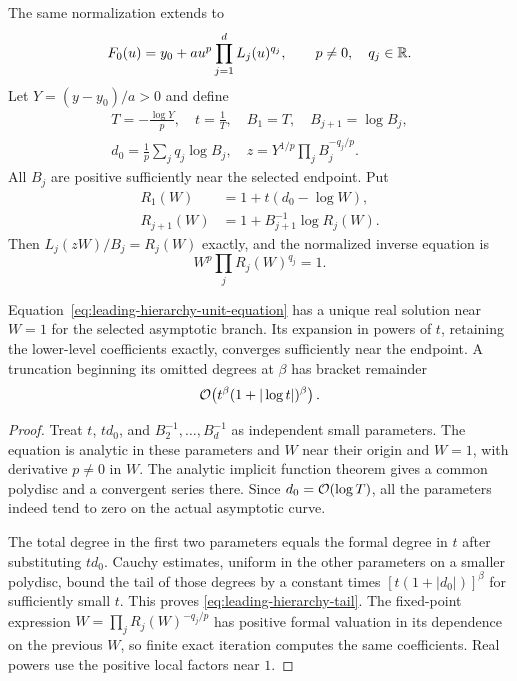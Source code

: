 The same normalization extends to
\begin{equation}
 F_0(u)=y_0+a u^p\prod_{j=1}^d L_j(u)^{q_j},
 \qquad p\ne0,\quad q_j\in\mathbb R.
 \label{eq:leading-hierarchy-core}
\end{equation}
Let $Y=(y-y_0)/a>0$ and define
\begin{equation}
\begin{gathered}
 T=-\frac{\log Y}{p},\quad t=\frac1T,\quad
 B_1=T,\quad B_{j+1}=\log B_j,\\
 d_0=\frac1p\sum_jq_j\log B_j,
 \quad z=Y^{1/p}\prod_jB_j^{-q_j/p}.
\end{gathered}
 \label{eq:leading-hierarchy-normalization}
\end{equation}
All $B_j$ are positive sufficiently near the selected endpoint. Put
\begin{align}
 R_1(W)&=1+t(d_0-\log W),\label{eq:leading-level-first-ratio}\\
 R_{j+1}(W)&=1+B_{j+1}^{-1}\log R_j(W).
 \label{eq:leading-level-next-ratio}
\end{align}
Then $L_j(zW)/B_j=R_j(W)$ exactly, and the normalized inverse equation is
\begin{equation}
 W^p\prod_jR_j(W)^{q_j}=1.
 \label{eq:leading-hierarchy-unit-equation}
\end{equation}

\begin{theorem}
\label{thm:leading-hierarchy-bracket}
Equation~\eqref{eq:leading-hierarchy-unit-equation} has a unique real
solution near $W=1$ for the selected asymptotic branch. Its expansion in
powers of $t$, retaining the lower-level coefficients exactly, converges
sufficiently near the endpoint. A truncation beginning its omitted degrees
at $\beta$ has bracket remainder
\begin{equation}
 \mathcal O\!\left(t^\beta(1+|\log t|)^\beta\right).
 \label{eq:leading-hierarchy-tail}
\end{equation}
\end{theorem}
\begin{proof}
Treat $t$, $td_0$, and $B_2^{-1},\ldots,B_d^{-1}$ as independent small
parameters. The equation is analytic in these parameters and $W$ near
their origin and $W=1$, with derivative $p\ne0$ in $W$.
The analytic implicit function theorem gives a common polydisc and a
convergent series there. Since $d_0=\mathcal O(\log T)$, all the parameters
indeed tend to zero on the actual asymptotic curve.

The total degree in the first two parameters equals the formal degree in
$t$ after substituting $td_0$. Cauchy estimates, uniform in the other
parameters on a smaller polydisc, bound the tail of those degrees by a
constant times $[t(1+|d_0|)]^\beta$ for sufficiently small $t$.
This proves \eqref{eq:leading-hierarchy-tail}. The fixed-point expression
$W=\prod_jR_j(W)^{-q_j/p}$ has positive formal valuation in its dependence
on the previous $W$, so finite exact iteration computes the same
coefficients. Real powers use the positive local factors near $1$.
\end{proof}

